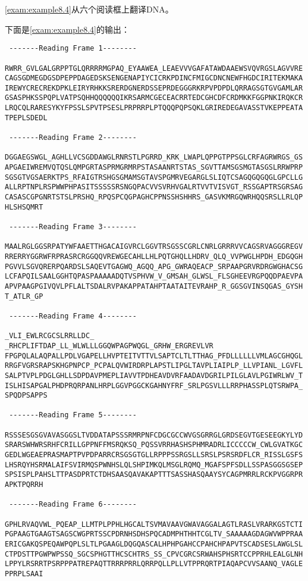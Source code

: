 \autoref{exam:example8.4}从六个阅读框上翻译DNA。



下面是\autoref{exam:example8.4}的输出：

\begin{lstlisting}
 -------Reading Frame 1--------

RWRR_GVLGALGRPPTGLQRRRRMGPAQ_EYAAWEA_LEAEVVVGAFATAWDAAEWSVQVRGSLAGVVRE
CAGSGDMEGDGSDPEPPDAGEDSKSENGENAPIYCICRKPDINCFMIGCDNCNEWFHGDCIRITEKMAKA
IREWYCRECREKDPKLEIRYRHKKSRERDGNERDSSEPRDEGGGRKRPVPDPDLQRRAGSGTGVGAMLAR
GSASPHKSSPQPLVATPSQHHQQQQQQIKRSARMCGECEACRRTEDCGHCDFCRDMKKFGGPNKIRQKCR
LRQCQLRARESYKYFPSSLSPVTPSESLPRPRRPLPTQQQPQPSQKLGRIREDEGAVASSTVKEPPEATA
TPEPLSDEDL

 -------Reading Frame 2--------

DGGAEGSWGL_AGHLLVCSGDDAWGLRNRSTLPGRRD_KRK_LWAPLQPPGTPPSGLCRFAGRWRGS_GS
APGAEIWREMVQTQSLQMPGRTASPRMGRMRPSTASAANRTSTAS_SGVTTAMSGSMGTASGSLRRWPRP
SGSGTVGSAERKTPS_RFAIGTRSHGSGMAMSGTAVSPGMRVEGARGLSLIQTCSAGQGQGQGLGPCLLG
ALLRPTNPLRSPWWPHPASITSSSSSRSNGQPACVVSVRHVGALRTVVTVISVGT_RSSGAPTRSGRSAG
CASASCGPGNRTSTSLPRSHQ_RPQSPCQGPAGHCPPNSSHSHHRS_GASVKMRGQWRHQQSRSLLRLQP
HLSHSQMRT

 -------Reading Frame 3--------

MAALRGLGGSRPATYWFAAETTHGACAIGVRCLGGVTRSGSSCGRLCNRLGRRRVVCAGSRVAGGGREGV
RRERRYGGRWFRPRASRCRGGQQVREWGECAHLLHLPQTGHQLLHDRV_QLQ_VVPWGLHPDH_EDGQGH
PGVVLSGVQRERPQARDSLSAQEVTGAGWQ_AGQQ_APG_GWRAQEACP_SRPAAPGRVRDRGWGHACSG
LCFAPQILSAALGGHTQPASPAAAAADQTVSPHVW_V_GMSAH_GLWSL_FLSGHEEVRGPQQDPAEVPA
APVPAAGPGIVQVLPFLALTSDALRVPAKAPPATAHPTAATAITEVRAHP_R_GGSGVINSQGAS_GYSH
T_ATLR_GP

 -------Reading Frame 4--------

_VLI_EWLRCGCSLRRLLDC_  _RHCPLIFTDAP_LL_WLWLLLGGQWPAGPWQGL_GRHW_ERGREVLVR
FPGPQLALAQPALLPDLVGAPELLHVPTEITVTTVLSAPTCLTLTTHAG_PFDLLLLLLVMLAGCGHQGL
RRGFVGRSRAPSKHGPNPCP_PCPALQVWIRDRPLAPSTLIPGLTAVPLIAIPLP_LLVPIANL_LGVFL
SALPTVPLPDGLGHLLSDPDAVPMEPLIAVVTPDHEAVDVRFAADAVDGRILPILGLAVLPGIWRLWV_T
ISLHISAPGALPHDPRQRPANLHRPLGGVPGGCKGAHNYFRF_SRLPGSVLLLRRPHASSPLQTSRWPA_
SPQDPSAPPS

 -------Reading Frame 5--------

RSSSESGSGVAVASGGSLTVDDATAPSSSRMRPNFCDGCGCCWVGSGRRGLGRDSEGVTGESEEGKYLYD
SRARSWHWRSRHFCRILLGPPNFFMSRQKSQ_PQSSVRRHASHSPHMRADRLICCCCCW_CWLGVATKGC
GEDLWGEAEPRASMAPTPVPDPARRCRSGSGTGLLRPPPSSRGSLLSRSLPSRSRDFLCR_RISSLGSFS
LHSRQYHSRMALAIFSVIRMQSPWNHSLQLSHPIMKQLMSGLRQMQ_MGAFSPFSDLLSSPASGGSGSEP
SPSISPLPAHSLTTPASDPRTCTDHSAASQAVAKAPTTTSASSHASQAAYSYCAGPMRRLRCKPVGGRPR
APKTPQRRH

 -------Reading Frame 6--------

GPHLRVAQVWL_PQEAP_LLMTPLPPHLHGCALTSVMAVAAVGWAVAGGALAGTLRASLVRARKGSTCTI
PGPAAGTGAAGTSAGSCWGPRTSSCPDRNHSDHSPQCADMPHTHHTCGLTV_SAAAAAGDAGWVWPPRAA
ERICGAKQSPEQAWPQPLSLTLPGAAGLDQGQASCALHPHPGAHCCPAHCHPAPVTSCADSESLAWGLSL
CTPDSTTPGWPWPSSQ_SGCSPHGTTHCSCHTRS_SS_CPVCGRCSRWAHSPHSRTCCPPRHLEALGLNH
LPPYLRSRRTPSRPPPATREPAQTTRRRPRRLQRRPQLLPLLVTPPRQRTPIAQAPCVVSAANQ_VAGLE
PPRPLSAAI
\end{lstlisting}

